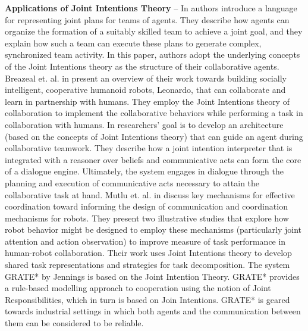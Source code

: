 \documentclass[11pt]{article}
\begin{document}
\textbf{Applications of Joint Intentions Theory} -- In \cite{kinny:planned-team}
authors introduce a language for representing joint plans for teams of agents.
They describe how agents can organize the formation of a suitably skilled team
to achieve a joint goal, and they explain how such a team can execute these
plans to generate complex, synchronized team activity. In this paper, authors
adopt the underlying concepts of the Joint Intentions theory as the structure of
their collaborative agents. Breazeal et. al. in \cite{breazeal:humanoid-robots}
present an overview of their work towards building socially intelligent,
cooperative humanoid robots, Leonardo, that can collaborate and learn in
partnership with humans. They employ the Joint Intentions theory of
collaboration to implement the collaborative behaviors while performing a task
in collaboration with humans. In \cite{subramanian:joint-intention-dialogue}
researchers' goal is to develop an architecture (based on the concepts of Joint
Intentions theory) that can guide an agent during collaborative teamwork. They
describe how a joint intention interpreter that is integrated with a reasoner
over beliefs and communicative acts can form the core of a dialogue engine.
Ultimately, the system engages in dialogue through the planning and execution of
communicative acts necessary to attain the collaborative task at hand. Mutlu et.
al. in \cite{mutlu:coordination-robot} discuss key mechanisms for effective
coordination toward informing the design of communication and coordination
mechanisms for robots. They present two illustrative studies that explore how
robot behavior might be designed to employ these mechanisms (particularly joint
attention and action observation) to improve measure of task performance in
human-robot collaboration. Their work uses Joint Intentions theory to develop
shared task representations and strategies for task decomposition. The system
GRATE* by Jennings \cite{jennings:joint-intention-hybrid} is based on the Joint
Intention Theory. GRATE* provides a rule-based modelling approach to cooperation
using the notion of Joint Responsibilities, which in turn is based on Join
Intentions. GRATE* is geared towards industrial settings in which both agents
and the communication between them can be considered to be reliable.\\
\end{document}
